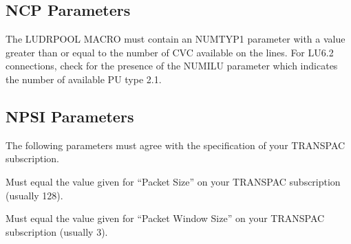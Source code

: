 \documentclass[letterpaper,10pt,english]{sphinxmanual}
\begin{document}
\ignorespaces 

\subsection{NCP Parameters}
\label{\detokenize{connectivity_guide:ncp-parameters}}\label{\detokenize{connectivity_guide:index-65}}
\sphinxAtStartPar
The LUDRPOOL MACRO must contain an NUMTYP1 parameter with a value greater than or equal to the number of CVC available on the lines. For LU6.2 connections, check for the presence of the NUMILU parameter which indicates the number of available PU type 2.1.

\ignorespaces 

\subsection{NPSI Parameters}
\label{\detokenize{connectivity_guide:npsi-parameters}}\label{\detokenize{connectivity_guide:index-66}}
\sphinxAtStartPar
The following parameters must agree with the specification of your TRANSPAC subscription.

\sphinxAtStartPar
{}
\begin{description}
\sphinxAtStartPar
Must equal the value given for “Packet Size” on your TRANSPAC subscription (usually 128).

\sphinxAtStartPar
Must equal the value given for “Packet Window Size” on your TRANSPAC subscription (usually 3).

\end{description}
\end{document}
